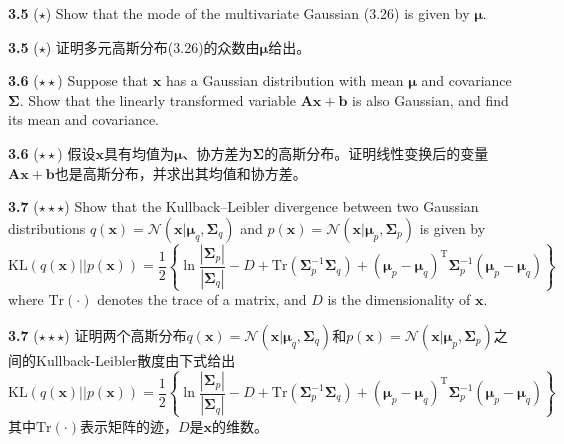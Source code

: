 \documentclass{article}
\begin{document}
\textbf{3.5} ($\star$) Show that the mode of the multivariate Gaussian (3.26) is given by $\boldsymbol{\mu}$.

\textbf{3.5} ($\star$) 证明多元高斯分布(3.26)的众数由$\boldsymbol{\mu}$给出。

\textbf{3.6} ($\star\star$) Suppose that $\mathbf{x}$ has a Gaussian distribution with mean $\boldsymbol{\mu}$ and covariance $\boldsymbol{\Sigma}$. Show that the linearly transformed variable $\mathbf{A}\mathbf{x} + \mathbf{b}$ is also Gaussian, and find its mean and covariance.

\textbf{3.6} ($\star\star$) 假设$\mathbf{x}$具有均值为$\boldsymbol{\mu}$、协方差为$\boldsymbol{\Sigma}$的高斯分布。证明线性变换后的变量$\mathbf{A}\mathbf{x} + \mathbf{b}$也是高斯分布，并求出其均值和协方差。

\textbf{3.7} ($\star\star\star$) Show that the Kullback–Leibler divergence between two Gaussian distributions $q(\mathbf{x}) = \mathcal{N}(\mathbf{x}|\boldsymbol{\mu}_q, \boldsymbol{\Sigma}_q)$ and $p(\mathbf{x}) = \mathcal{N}(\mathbf{x}|\boldsymbol{\mu}_p, \boldsymbol{\Sigma}_p)$ is given by
\begin{equation}
\mathrm{KL}(q(\mathbf{x})||p(\mathbf{x})) 
= \frac{1}{2} \left\{ \ln \frac{|\boldsymbol{\Sigma}_p|}{|\boldsymbol{\Sigma}_q|} - D + \mathrm{Tr}\left(\boldsymbol{\Sigma}_p^{-1}\boldsymbol{\Sigma}_q\right) + (\boldsymbol{\mu}_p - \boldsymbol{\mu}_q)^\mathrm{T} \boldsymbol{\Sigma}_p^{-1} (\boldsymbol{\mu}_p - \boldsymbol{\mu}_q) \right\} \tag{3.199}
\end{equation}
where $\mathrm{Tr}(\cdot)$ denotes the trace of a matrix, and $D$ is the dimensionality of $\mathbf{x}$.

\textbf{3.7} ($\star\star\star$) 证明两个高斯分布$q(\mathbf{x}) = \mathcal{N}(\mathbf{x}|\boldsymbol{\mu}_q, \boldsymbol{\Sigma}_q)$和$p(\mathbf{x}) = \mathcal{N}(\mathbf{x}|\boldsymbol{\mu}_p, \boldsymbol{\Sigma}_p)$之间的Kullback-Leibler散度由下式给出
\begin{equation}
\mathrm{KL}(q(\mathbf{x})||p(\mathbf{x})) 
= \frac{1}{2} \left\{ \ln \frac{|\boldsymbol{\Sigma}_p|}{|\boldsymbol{\Sigma}_q|} - D + \mathrm{Tr}\left(\boldsymbol{\Sigma}_p^{-1}\boldsymbol{\Sigma}_q\right) + (\boldsymbol{\mu}_p - \boldsymbol{\mu}_q)^\mathrm{T} \boldsymbol{\Sigma}_p^{-1} (\boldsymbol{\mu}_p - \boldsymbol{\mu}_q) \right\} \tag{3.199}
\end{equation}
其中$\mathrm{Tr}(\cdot)$表示矩阵的迹，$D$是$\mathbf{x}$的维数。
\end{document}
